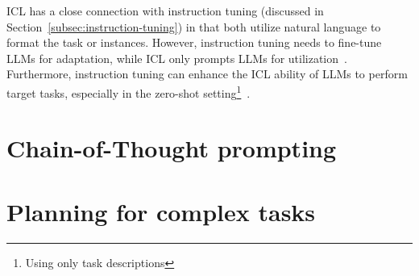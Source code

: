 ICL has a close connection with instruction tuning (discussed in Section~\ref{subsec:instruction-tuning}) in that both utilize natural language to format the task or instances.
However, instruction tuning needs to fine-tune LLMs for adaptation, while ICL only prompts LLMs for utilization~\cite{survey}.
Furthermore, instruction tuning can enhance the ICL ability of LLMs to perform target tasks, especially in the zero-shot setting\footnote{Using only task descriptions}~\cite{chung2022scaling}.

\section{Chain-of-Thought prompting}
\label{sec:chain-of-thought}
\lipsum

\section{Planning for complex tasks}
\label{sec:planning}
\lipsum